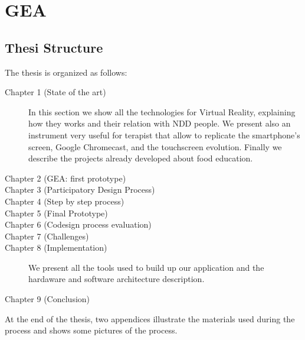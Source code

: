 \section{GEA}
\subsection{Thesi Structure}
The thesis is organized as follows:
\begin{description}
\item[Chapter 1 (State of the art)] In this section we show all the technologies for Virtual Reality, explaining how they works and their relation with NDD people. We present also an instrument very useful for terapist that allow to replicate the smartphone's screen, Google Chromecast, and the touchscreen evolution. Finally we describe the projects already developed about food education.
\item[Chapter 2 (GEA: first prototype)]
\item[Chapter 3 (Participatory Design Process)]  
\item[Chapter 4 (Step by step process)]
\item[Chapter 5 (Final Prototype)] 
\item[Chapter 6 (Codesign process evaluation)]
\item[Chapter 7 (Challenges)]  
\item[Chapter 8 (Implementation)] We present all the tools used to build up our application and the hardaware and software architecture description.
\item[Chapter 9 (Conclusion)]
\end{description}
At the end of the thesis, two appendices illustrate the materials used during the process
and shows some pictures of the process.
 
